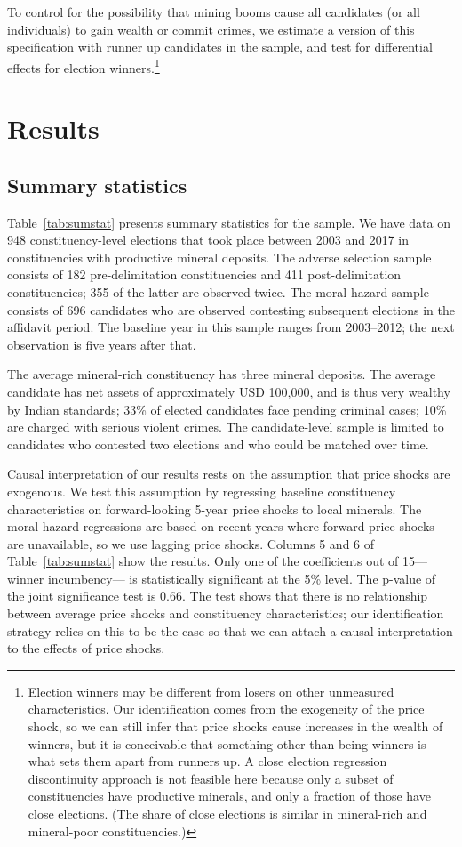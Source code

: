 \documentclass[12pt,letterpaper]{article}
\begin{document}
To control for the possibility that mining booms cause all candidates
(or all individuals) to gain wealth or commit crimes, we estimate a
version of this specification with runner up candidates in the sample,
and test for differential effects for election
winners.\footnote{Election winners may be different from losers on
  other unmeasured characteristics. Our identification comes from the
  exogeneity of the price shock, so we can still infer that price
  shocks cause increases in the wealth of winners, but it is
  conceivable that something other than being winners is what sets them
  apart from runners up. A close election regression discontinuity
  approach is not feasible here because only a subset of
  constituencies have productive minerals, and only a fraction of
  those have close elections. (The share of close elections is
  similar in mineral-rich and mineral-poor constituencies.)}

\section{Results}
\label{sec:results}

\subsection{Summary statistics}
\label{ssec:sumstats}

Table~\ref{tab:sumstat} presents summary statistics for the sample. We
have data on 948 constituency-level elections that took place between
2003 and 2017 in constituencies with productive mineral deposits. The
adverse selection sample consists of 182 pre-delimitation constituencies and 411
post-delimitation constituencies; 355 of the latter are observed
twice. The moral hazard sample consists of 696 candidates who are
observed contesting subsequent elections in the affidavit period. The
baseline year in this sample ranges from 2003--2012;
the next observation is five years after that.

The average mineral-rich constituency has three mineral deposits.  The
average candidate has net assets of approximately USD 100,000, and is
thus very wealthy by Indian standards; 33\% of elected candidates face
pending criminal cases; 10\% are charged with serious violent
crimes. The candidate-level sample is limited to candidates who
contested two elections and who could be matched over time.

Causal interpretation of our results rests on the assumption that
price shocks are exogenous. We test this assumption by regressing
baseline constituency characteristics on forward-looking 5-year price
shocks to local minerals. The moral hazard regressions are based on
recent years where forward price shocks are unavailable, so we use
lagging price shocks.  Columns 5 and 6 of Table~\ref{tab:sumstat} show
the results. Only one of the coefficients out of 15---winner
incumbency--- is statistically significant at the 5\% level. The
p-value of the joint significance test is 0.66. The test shows that
there is no relationship between average price shocks and constituency
characteristics; our identification strategy relies on this to be the
case so that we can attach a causal interpretation to the effects of
price shocks.
\end{document}
